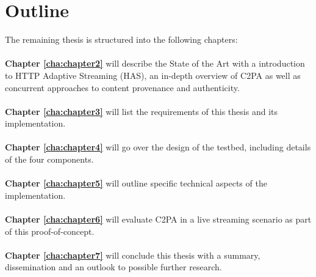 \section{Outline\label{sec:outline}}

The remaining thesis is structured into the following chapters:
\\
\\
\textbf{Chapter \ref{cha:chapter2}} will describe the State of the Art with a introduction to HTTP Adaptive Streaming (HAS), an in-depth overview of C2PA as well as concurrent approaches to content provenance and authenticity.
\\
\\
\textbf{Chapter \ref{cha:chapter3}} will list the requirements of this thesis and its implementation.
\\
\\
\textbf{Chapter \ref{cha:chapter4}} will go over the design of the testbed, including details of the four components.
\\
\\
\textbf{Chapter \ref{cha:chapter5}} will outline specific technical aspects of the implementation.
\\
\\
\textbf{Chapter \ref{cha:chapter6}} will evaluate C2PA in a live streaming scenario as part of this proof-of-concept.
\\
\\
\textbf{Chapter \ref{cha:chapter7}} will conclude this thesis with a summary, dissemination and an outlook to possible further research.